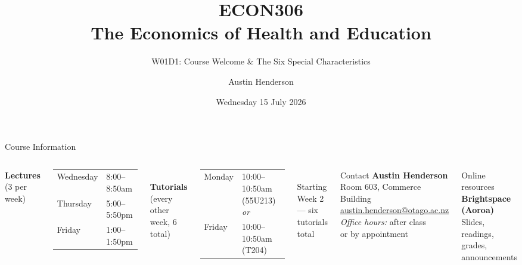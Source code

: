 \documentclass[aspectratio=169, 12pt]{beamer}
\title[ECON306: W01D1 — Course Introduction]{ECON306\\The Economics of Health and Education}
\subtitle{W01D1: Course Welcome \& The Six Special Characteristics}
\author{Austin Henderson}
\institute{Department of Economics\\University of Otago}
\date{Wednesday 15 July 2026}
\begin{document}
\begin{frame}[plain]
  \titlepage
\end{frame}

\begin{frame}{Course Information}
  \begin{columns}
      \textbf{Lectures} (3 per week)\\[0.3em]
      \begin{tabular}{ll}
        Wednesday & 8:00--8:50am \\
        Thursday  & 5:00--5:50pm \\
        Friday    & 1:00--1:50pm \\
      \end{tabular}\\[0.8em]
      \textbf{Tutorials} (every other week, 6 total)\\
      \begin{tabular}{ll}
        Monday & 10:00--10:50am (55U213) \emph{or} \\
        Friday & 10:00--10:50am (T204) \\
      \end{tabular}\\[0.4em]
      {\footnotesize Starting Week 2 --- six tutorials total}
      \begin{block}{Contact}
        \textbf{Austin Henderson}\\
        Room 603, Commerce Building\\
        \href{mailto:austin.henderson@otago.ac.nz}{austin.henderson@otago.ac.nz}\\[0.4em]
        \emph{Office hours:} after class\\
        or by appointment
      \end{block}
      \begin{alertblock}{Online resources}
        \textbf{Brightspace (Aoroa)}\\
        {\footnotesize Slides, readings, grades, announcements}
      \end{alertblock}
  \end{columns}
\end{frame}
\end{document}
